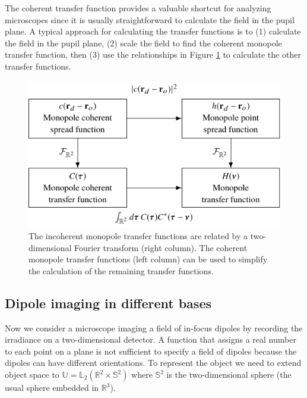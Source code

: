 \documentclass[]{osa-article}
\providecommand{\mbb}[1]{\mathbb{#1}}
\begin{document}
The coherent transfer function provides a valuable shortcut for analyzing
microscopes since it is usually straightforward to calculate the field in the
pupil plane. A typical approach for calculating the transfer functions is to (1)
calculate the field in the pupil plane, (2) scale the field to find the
coherent monopole transfer function, then (3) use the relationships in Figure
\ref{fig:monopole-transfer-functions} to calculate the other transfer functions.

\begin{figure}
  \centering
  \includegraphics[scale=1.0]{../figures/monopole-transfer-functions/monopole-transfer-functions.pdf}
  \caption{The incoherent monopole transfer functions are related by a
    two-dimensional Fourier transform (right column). The coherent monopole
    transfer functions (left column) can be used to simplify the calculation of
    the remaining transfer functions.}
   \label{fig:monopole-transfer-functions}
 \end{figure}

\subsection{Dipole imaging in different bases}\label{sec:dipole}
Now we consider a microscope imaging a field of in-focus dipoles by recording
the irradiance on a two-dimensional detector. A function that assigns a real
number to each point on a plane is not sufficient to specify a field of dipoles
because the dipoles can have different orientations. To represent the object we
need to extend object space to $\mbb{U} = \mbb{L}_2(\mbb{R}^2\times\mbb{S}^2)$
where $\mbb{S}^2$ is the two-dimensional sphere (the usual sphere embedded in
$\mbb{R}^3$).
\end{document}
